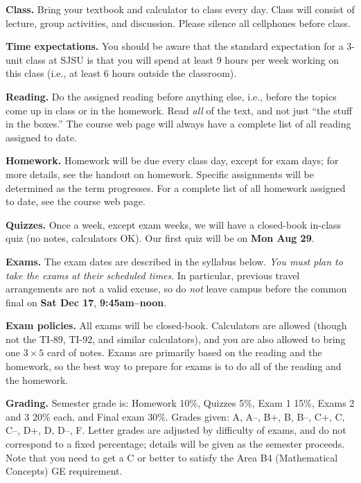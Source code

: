 \documentclass[letterpaper]{article}
\begin{document}
{\bf Class.}  Bring your textbook and calculator to class every day.
Class will consist of lecture, group activities, and discussion.
Please silence all cellphones before class.

{\bf Time expectations.\/} You should be aware that the standard
expectation for
a 3-unit class at SJSU is that you will spend at least 9 hours
per week working on this class (i.e., at least 6 hours outside
the classroom).

{\bf Reading.}  Do the assigned reading before anything else, i.e.,
before the topics come up in class or in the homework.  Read {\it
  all\/} of the text, and not just ``the stuff in the boxes.''  The
course web page will always have a complete list of all reading
assigned to date.

{\bf Homework.}  Homework will be due every class day, except for exam
days; for more details, see the handout on homework.  Specific
assignments will be determined as the term progresses.  For a complete
list of all homework assigned to date, see the course web page.

{\bf Quizzes.}  Once a week, except exam weeks, we will have a
closed-book in-class quiz (no notes, calculators OK).  Our first quiz
will be on {\bf Mon Aug 29}.

\newcommand{\finaldate}{Sat Dec 17}
\newcommand{\finaltime}{9:45am--noon}

{\bf Exams.}  The exam dates are described in the syllabus below.
{\it You must plan to take the exams at their scheduled times}.  In
particular, previous travel arrangements are not a valid excuse, so do
{\it not\/} leave campus before the common final on {\bf\finaldate},
{\bf\finaltime}.

{\bf Exam policies.}  All exams will be closed-book.  Calculators are
allowed (though not the TI-89, TI-92, and similar calculators), and
you are also allowed to bring one $3\times 5$ card of notes.  Exams
are primarily based on the reading and the homework, so the best way
to prepare for exams is to do all of the reading and the homework.

{\bf Grading.}  Semester grade is: Homework 10\%, Quizzes 5\%, Exam 1
15\%, Exams 2 and 3 20\% each, and Final exam 30\%.  Grades given:
A, A--, B+, B, B--, C+, C, C--, D+, D, D--, F.  Letter grades are
adjusted by difficulty of exams, and do not correspond to a fixed
percentage; details will be given as the semester proceeds.  Note
that you need to get a C or better to satisfy the Area B4 (Mathematical
Concepts) GE
requirement.
\end{document}
